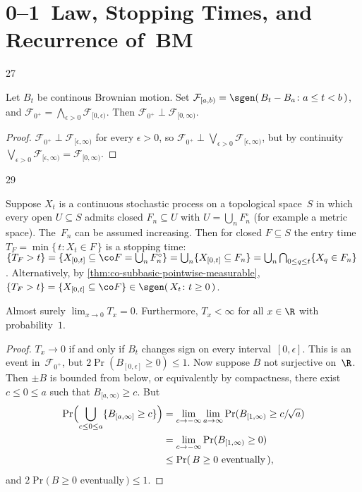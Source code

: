 \section	{0--1~Law, Stopping Times, and Recurrence of~BM}

\setcounter	{block}	{27}
\begin	{theorem}[0--1~law]
Let $B_t$ be continous Brownian motion.
Set \( \mathcal F_{[a,b)} = \sgen(\, B_t - B_a \colon a \le t < b \,) \),
and \( \mathcal F_{0^+} = \bigwedge_{\epsilon>0} \mathcal F_{[0,\epsilon)} \).
Then \( \mathcal F_{0^+} \perp \mathcal F_{[0,\infty)} \).
\end	{theorem}
\begin	{proof}
\( \mathcal F_{0^+} \perp \mathcal F_{[\epsilon,\infty)} \)
for every \( \epsilon > 0 \),
so \( \mathcal F_{0^+}
\perp \bigvee_{\epsilon>0} \mathcal F_{[\epsilon,\infty)} \),
but by continuity \( \bigvee_{\epsilon>0} \mathcal F_{[\epsilon,\infty)}
= \mathcal F_{[0,\infty)} \).
\end	{proof}

\setcounter	{block}	{29}
\begin	{remark}
Suppose $X_t$ is a continuous stochastic process
on a topological space~$S$
in which every open \( U \subseteq S \) admits closed \( F_n \subseteq U \)
with \( U = \bigcup_n F_n^\circ \)
(for example a metric space).
The~$F_n$ can be assumed increasing.
Then for closed \( F \subseteq S \)
the entry time \( T_F = \min\{\, t \colon X_t \in F \,\} \)
is a stopping time:
\(	\{ T_F > t \}
=	\{ X_{[0,t]} \subseteq \co F = \bigcup_n F_n^\circ \}
=	\bigcup_n \{ X_{[0,t]} \subseteq F_n \}
=	\bigcup_n \bigcap_{0\le q\le t} \{ X_q \in F_n \}
\).
Alternatively, by \autoref{thm:co-subbasic-pointwise-measurable},
\( \{T_F > t\} = \{X_{[0,t]} \subseteq \co F\}
\in \sgen(\, X_t \colon t \ge 0 \,) \).
\end	{remark}

\begin	{proposition}
Almost surely \( \lim_{x\to0} T_x = 0 \).
Furthermore, \( T_x < \infty \) for all \( x \in \R \)
with probability~$1$.
\end	{proposition}
\begin	{proof}
\( T_x \to 0 \) if and only if $B_t$ changes sign
on every interval~$[0,\epsilon]$.
This is an event in~$\mathcal F_{0^+}$,
but \( 2\Pr(B_{[0,\epsilon]} \ge 0) \le 1 \).
Now suppose $B$ not surjective on~$\R$.
Then \( \pm B \) is bounded from below,
or equivalently by compactness,
there exist \( c \le 0 \le a \) such that \( B_{[a,\infty)} \ge c \).
But
\begin	{align*}
	\Pr\Bigl( \bigcup_{c \le 0 \le a} \{ B_{[a,\infty]} \ge c \} \Bigr)
	&=	\lim_{c\to-\infty} \lim_{a\to\infty}
			\Pr( B_{[1,\infty)} \ge c/\!\sqrt a ) \\
	&=	\lim_{c\to-\infty}
			\Pr( B_{[1,\infty)} \ge 0 ) \\
	&\le	\Pr(\,\text{\( B \ge 0 \) eventually}\,) \text,
\end	{align*}
and \( 2\Pr(\, B \ge 0 \) eventually\(\,) \le 1 \).
\end	{proof}

